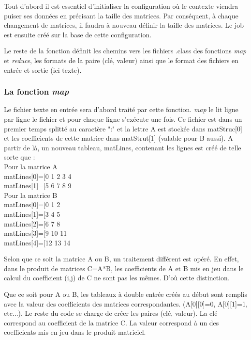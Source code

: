 \par Tout d'abord il est essentiel d'initialiser la configuration où le contexte viendra puiser ses données en précisant la taille des matrices. Par conséquent, à chaque changement de matrices, il faudra à nouveau définir la taille des matrices. Le job est ensuite créé sur la base de cette configuration.

\par Le reste de la fonction définit les chemins vers les fichiers .class des fonctions \textit{map} et \textit{reduce}, les formats de la paire (clé, valeur) ainsi que le format des fichiers en entrée et sortie (ici texte).
  
\subsubsection{La fonction \textit{map}}

\par Le fichier texte en entrée sera d'abord traité par cette fonction. \textit{map} le lit ligne par ligne le fichier et pour chaque ligne s'exécute une fois. Ce fichier est dans un premier temps splitté au caractère ":" et la lettre A est stockée dans matStruc[0] et les coefficients de cette matrice dans matStrut[1] (valable pour B aussi). A partir de là, un nouveau tableau, matLines, contenant les lignes est créé de telle sorte que \smallskip:\\
\smallskip
Pour la matrice A\\
matLines[0]=[0 1 2 3 4\\
\smallskip
matLines[1]=[5 6 7 8 9\\
Pour la matrice B\\
matLines[0]=[0 1 2\\
matLines[1]=[3 4 5\\
matLines[2]=[6 7 8\\
matLines[3]=[9 10 11\\
matLines[4]=[12 13 14\\

\par Selon que ce soit la matrice A ou B, un traitement différent est opéré. En effet, dans le produit de matrices C=A*B, les coefficients de A et B mis en jeu dans le calcul du coefficient (i,j) de C ne sont pas les mêmes. D'où cette distinction.

\par Que ce soit pour A ou B, les tableaux à double entrée créés au début sont remplis avec la valeur des coefficients des matrices correspondantes. (A[0][0]=0, A[0][1]=1, etc...). Le reste du code se charge de créer les paires (clé, valeur). La clé correspond au coefficient de la matrice C. La valeur correspond à un des coefficients mis en jeu dans le produit matriciel.\\ 

